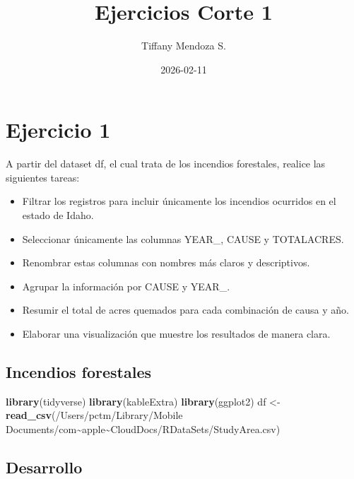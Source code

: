 \documentclass[
]{book}
\title{Ejercicios Corte 1}
\author{Tiffany Mendoza S.}
\date{2026-02-11}
\newenvironment{Shaded}{\begin{snugshade}}{\end{snugshade}}
\newcommand{\FunctionTok}[1]{\textcolor[rgb]{0.13,0.29,0.53}{\textbf{#1}}}
\newcommand{\NormalTok}[1]{#1}
\newcommand{\OtherTok}[1]{\textcolor[rgb]{0.56,0.35,0.01}{#1}}
\newcommand{\StringTok}[1]{\textcolor[rgb]{0.31,0.60,0.02}{#1}}
\begin{document}
\maketitle

{
\setcounter{tocdepth}{1}
\tableofcontents
}
\chapter{Ejercicio 1}\label{ejercicio-1}

A partir del dataset df, el cual trata de los incendios forestales, realice las siguientes tareas:

\begin{itemize}
\item
  Filtrar los registros para incluir únicamente los incendios ocurridos en el estado de Idaho.
\item
  Seleccionar únicamente las columnas YEAR\_, CAUSE y TOTALACRES.
\item
  Renombrar estas columnas con nombres más claros y descriptivos.
\item
  Agrupar la información por CAUSE y YEAR\_.
\item
  Resumir el total de acres quemados para cada combinación de causa y año.
\item
  Elaborar una visualización que muestre los resultados de manera clara.
\end{itemize}

\section*{Incendios forestales}\label{incendios-forestales}

\begin{Shaded}
\begin{Highlighting}[]
\FunctionTok{library}\NormalTok{(tidyverse)}
\FunctionTok{library}\NormalTok{(kableExtra)}
\FunctionTok{library}\NormalTok{(ggplot2)}
\NormalTok{df }\OtherTok{\textless{}{-}} \FunctionTok{read\_csv}\NormalTok{(}\StringTok{\textquotesingle{}/Users/pctm/Library/Mobile Documents/com\textasciitilde{}apple\textasciitilde{}CloudDocs/RDataSets/StudyArea.csv\textquotesingle{}}\NormalTok{)}
\end{Highlighting}
\end{Shaded}

\section*{Desarrollo}\label{desarrollo}
\end{document}
